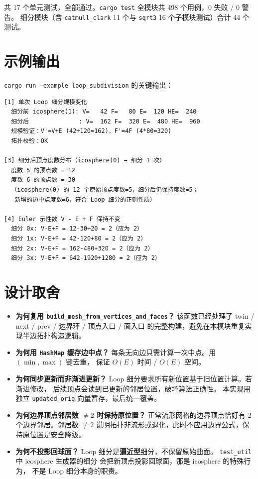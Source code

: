 \documentclass[11pt,a4paper]{article}
\begin{document}
共 17 个单元测试，全部通过。\texttt{cargo test} 全模块共 498 个用例，0 失败 / 0 警告。
细分模块（含 \texttt{catmull\_clark} 11 个与 \texttt{sqrt3} 16 个子模块测试）合计 44 个测试。

\section{示例输出}

\texttt{cargo run --example loop\_subdivision} 的关键输出：

\begin{lstlisting}[basicstyle=\ttfamily\scriptsize, numbers=none, frame=single]
[1] 单次 Loop 细分规模变化
  细分前 icosphere(1): V=   42 F=   80 E=  120 HE=  240
  细分后              : V=  162 F=  320 E=  480 HE=  960
  规模验证：V'=V+E (42+120=162)，F'=4F (4*80=320)
  拓扑校验：OK

[3] 细分后顶点度数分布（icosphere(0) → 细分 1 次）
  度数 5 的顶点数 = 12
  度数 6 的顶点数 = 30
  （icosphere(0) 的 12 个原始顶点度数=5，细分后仍保持度数=5；
   新增的边中点度数=6，符合 Loop 细分的正则性质）

[4] Euler 示性数 V - E + F 保持不变
  细分 0x: V-E+F = 12-30+20 = 2（应为 2）
  细分 1x: V-E+F = 42-120+80 = 2（应为 2）
  细分 2x: V-E+F = 162-480+320 = 2（应为 2）
  细分 3x: V-E+F = 642-1920+1280 = 2（应为 2）
\end{lstlisting}

\section{设计取舍}

\begin{itemize}
  \item \textbf{为何复用 \texttt{build\_mesh\_from\_vertices\_and\_faces}？}
        该函数已经处理了 twin / next / prev / 边界环 / 顶点入口 / 面入口
        的完整构建，避免在本模块重复实现半边拓扑构造逻辑。
  \item \textbf{为何用 \texttt{HashMap} 缓存边中点？}
        每条无向边只需计算一次中点。用 $(\min, \max)$ 键去重，
        保证 $O(E)$ 时间 / $O(E)$ 空间。
  \item \textbf{为何同步更新而非渐进更新？}
        Loop 细分要求所有新位置基于旧位置计算。若渐进修改，
        后续顶点会读到已更新的邻居位置，破坏算法正确性。
        本实现用独立 \texttt{updated\_orig} 向量暂存，最后统一覆盖。
  \item \textbf{为何边界顶点邻居数 $\neq 2$ 时保持原位置？}
        正常流形网格的边界顶点恰好有 2 个边界邻居。邻居数 $\neq 2$
        说明拓扑非流形或退化，此时不应用边界公式，保持原位置是安全降级。
  \item \textbf{为何不投影回球面？}
        Loop 细分是\textbf{逼近型}细分，不保留原始曲面。
        \texttt{test\_util} 中 icosphere 生成器的细分
        会把新顶点投影回球面，那是 icosphere 的特殊行为，
        不是 Loop 细分本身的职责。
\end{itemize}
\end{document}

